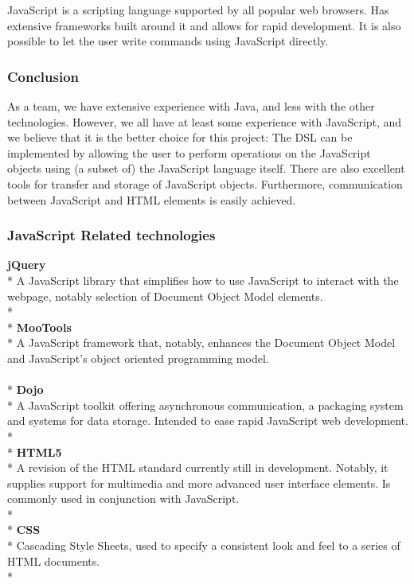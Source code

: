 JavaScript is a scripting language supported by all popular web browsers. Has extensive frameworks built around it and allows for rapid development. It is also possible to let the user write commands using JavaScript directly.

\subsubsection{Conclusion}
As a team, we have extensive experience with Java, and less with the other technologies. However, we all have at least some experience with JavaScript, and we believe that it is the better choice for this project: The DSL can be implemented by allowing the user to perform operations on the JavaScript objects using (a subset of) the JavaScript language itself. There are also excellent tools for transfer and storage of JavaScript objects. Furthermore, communication between JavaScript and HTML elements is easily achieved.

\subsubsection{JavaScript Related technologies}

\textbf{jQuery}\\*
A JavaScript library that simplifies how to use JavaScript to interact with the webpage, notably selection of Document Object Model elements.\\*
\\*
\textbf{MooTools}\\*
A JavaScript framework that, notably, enhances the Document Object Model and JavaScript's object oriented programming model.\\
\\*
\textbf{Dojo}\\*
A JavaScript toolkit offering asynchronous communication, a packaging system and systems for data storage. Intended to ease rapid JavaScript web development.\\*
\\*
\textbf{HTML5}\\*
A revision of the HTML standard currently still in development. Notably, it supplies support for multimedia and more advanced user interface elements. Is commonly used in conjunction with JavaScript.\\*
\\*
\textbf{CSS}\\*
Cascading Style Sheets, used to specify a consistent look and feel to a series of HTML documents.\\*


